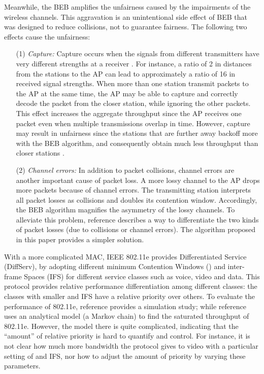 \documentclass[letterpaper, 10 pt, conference]{ieeeconf}
\begin{document}
Meanwhile, the BEB amplifies the unfairness caused by the impairments of the wireless channels. This aggravation is an unintentional side
effect of BEB that was designed to reduce collisions, not to guarantee fairness. The following two effects 
cause the unfairness:

\begin{itemize}

\item [(1)] {\em Capture:} Capture occurs when the signals from different
transmitters have very different strengths at a receiver \cite{Capture}.
For instance, a ratio of 2 in distances from the stations to the AP can lead to approximately
a ratio of 16 in received signal strengths. When more than one
station transmit packets to the AP at the same time, the AP may be able to capture and
correctly decode the packet from the closer station, while ignoring
the other packets. This effect increases
the aggregate throughput since the AP receives one packet even when multiple transmissions
overlap in time. However, capture may result in unfairness since the stations that are further away backoff
more with the BEB algorithm, and consequently obtain much less throughput than closer stations
\cite{sniff_capture}.

\item [(2)]  {\em Channel errors:} In addition to packet collisions, channel errors are another
important cause of packet loss. A more lossy channel to the AP drops more packets because of channel errors.
The transmitting station interprets all packet losses as collisions
and doubles its contention window. Accordingly, the BEB algorithm magnifies
the asymmetry of the lossy channels.
To alleviate this problem, reference \cite{Pang_loss_differentiation}
describes a way to differentiate the two kinds of packet losses (due
to collisions or channel errors). The algorithm proposed in
this paper provides a simpler solution.

\end{itemize}

With a more complicated MAC, IEEE 802.11e \cite{80211e} provides
Differentiated Service (DiffServ), by adopting different minimum Contention
Windows () and inter-frame Spaces (IFS) for different service classes
such as voice, video and data. This protocol provides relative performance
differentiation among different classes: the classes with smaller  
and IFS have a relative priority over others. To evaluate the performance of
802.11e, reference \cite{EDCF_sim} provides a simulation study; while
reference \cite{Saturated_80211e} uses an analytical model (a Markov
chain) to find the saturated throughput of 802.11e. However, the model
there is quite complicated, indicating that the {}``amount'' of
relative priority is hard to quantify and control. For instance, it is
not clear how much more bandwidth the protocol gives to video with a particular setting of  and IFS, nor
how to adjust the amount of priority by varying these parameters.
\end{document}
